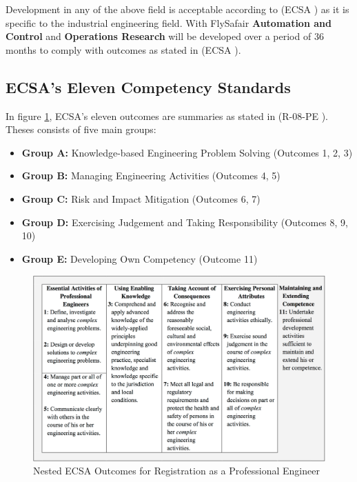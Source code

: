 \documentclass[11pt,a4paper]{article}
\begin{document}
		Development in any of the above field is acceptable according to (ECSA \citeyear{ECSA_2013a}) as it is specific to the industrial engineering field. With FlySafair \textbf{Automation and Control} and \textbf{Operations Research} will be developed over a period of 36 months to comply with outcomes as stated in (ECSA \citeyear{ECSA_2012a}).
		
	\subsection{ECSA's Eleven Competency Standards}
		In figure \ref{fig: ECSA}, ECSA's eleven outcomes are summaries as stated in (R-08-PE \citeyear{ECSA_2012b}). 
		Theses consists of five main groups:
		
		\begin{itemize}
		
		\item[]	\textbf{Group A:} Knowledge-based Engineering Problem Solving (Outcomes 1, 2, 3)
			

		\item[]	\textbf{Group B:} Managing Engineering Activities (Outcomes 4, 5)

		\item[]	\textbf{Group C:} Risk and Impact Mitigation (Outcomes 6, 7)

		\item[]	\textbf{Group D:} Exercising Judgement and Taking Responsibility (Outcomes 8, 9, 10)

		\item[]	\textbf{Group E:} Developing Own Competency (Outcome 11)
				
		\end{itemize}

		\begin{figure}[H]
		\centering
		\includegraphics[width=\textwidth]{Extra/ECSA_Outcomes.png}
		\caption{Nested ECSA Outcomes for Registration as a Professional Engineer}\label{fig: ECSA}
		\end{figure}
\end{document}
